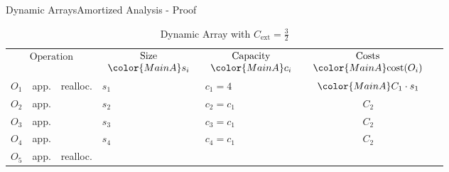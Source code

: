 
\begin{frame}{Dynamic Arrays}{Amortized Analysis - Proof}
  \vspace*{-1.0em}%
  \begin{table}[!h]%
    \caption{Dynamic Array with %
      $C_\text{ext} = \frac{3}{2}$}%
    \label{tab:amortized_analysis_limit}%
    \vspace*{-0.2em}%
    \begin{tabular}{|l|l|l|l|l|c|@{}l}
\cline{1-6}%
      \multicolumn{3}{|c|}{$\begin{array}{c}
          \text{Operation}\\
        \end{array}$} &
      $\begin{array}{c}
        \text{Size}\\
        {\color{MainA}s_i}
      \end{array}$ &
      $\begin{array}{c}
        \text{Capacity}\\
        {\color{MainA}c_i}
      \end{array}$ &
      $\begin{array}{c}
        \text{Costs}\\
        {\color{MainA}\mathrm{cost}(O_i)}
      \end{array}$\\
\cline{1-6}
      $O_1$ &app. & {\color{MainA}realloc.} &
      $s_1$ & {\color{MainA}$c_1=4$} &
      ${\color{MainA}C_1 \cdot s_1}$ &
      \raisebox{-0.5em}{\multirow{4}{*}{%
        $\left.\begin{array}{@{}l@{}}\\[4.0em]\end{array}\right\rbrace
        \begin{array}{@{}l@{}}
           \text{distance}\\
           4 \geq \left\lfloor\dfrac{{\color{MainA}s_1}}{2}\right\rfloor
        \end{array}$%
      }}\\
      $O_2$ &app.& {} & $s_2$ & $c_2 = c_1$ & $C_2$\\
      $O_3$ &app.& {} & $s_3$ & $c_3 = c_1$ & $C_2$\\
      $O_4$ &app.& {} & $s_4$ & $c_4 = c_1$ & $C_2$\\
\cline{1-6}%
      $O_5$ &app.& {\color{MainA}realloc.} &

\end{tabular}
\end{table}
\end{frame}
